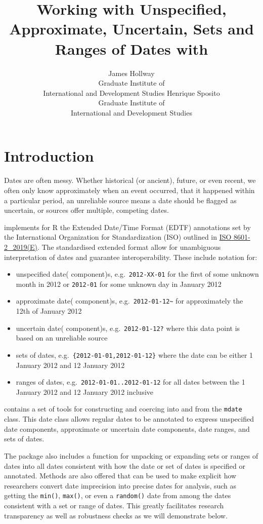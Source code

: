\documentclass[
]{jss}
\author{
James Hollway\\Graduate Institute of\\
International and Development Studies \And Henrique Sposito\\Graduate
Institute of\\
International and Development Studies
}
\title{Working with Unspecified, Approximate, Uncertain, Sets and Ranges
of Dates with \pkg{messydates}}
\providecommand{\tightlist}{%
  \setlength{\itemsep}{0pt}\setlength{\parskip}{0pt}}
\begin{document}
\hypertarget{introduction}{%
\section{Introduction}\label{introduction}}

Dates are often messy. Whether historical (or ancient), future, or even
recent, we often only know approximately when an event occurred, that it
happened within a particular period, an unreliable source means a date
should be flagged as uncertain, or sources offer multiple, competing
dates.

 implements for R the Extended Date/Time Format (EDTF)
annotations set by the International Organization for Standardization
(ISO) outlined in \href{https://www.iso.org/standard/70908.html}{ISO
8601-2\_2019(E)}. The standardised extended format allow for unambiguous
interpretation of dates and guarantee interoperability. These include
notation for:

\begin{itemize}
\tightlist
\item
  unspecified date( component)s, e.g.~\texttt{2012-XX-01} for the first
  of some unknown month in 2012 or \texttt{2012-01} for some unknown day
  in January 2012
\item
  approximate date( component)s,
  e.g.~\texttt{2012-01-12\textasciitilde{}} for approximately the 12th
  of January 2012
\item
  uncertain date( component)s, e.g.~\texttt{2012-01-12?} where this data
  point is based on an unreliable source
\item
  sets of dates, e.g.~\texttt{\{2012-01-01,2012-01-12\}} where the date
  can be either 1 January 2012 and 12 January 2012
\item
  ranges of dates, e.g.~\texttt{2012-01-01..2012-01-12} for all dates
  between the 1 January 2012 and 12 January 2012 inclusive
\end{itemize}

 contains a set of tools for constructing and coercing
into and from the \texttt{mdate} class. This date class allows regular
dates to be annotated to express unspecified date components,
approximate or uncertain date components, date ranges, and sets of
dates.

The package also includes a function for unpacking or expanding sets or
ranges of dates into all dates consistent with how the date or set of
dates is specified or annotated. Methods are also offered that can be
used to make explicit how researchers convert date imprecision into
precise dates for analysis, such as getting the \texttt{min()},
\texttt{max()}, or even a \texttt{random()} date from among the dates
consistent with a set or range of dates. This greatly facilitates
research transparency as well as robustness checks as we will
demonstrate below.
\end{document}

